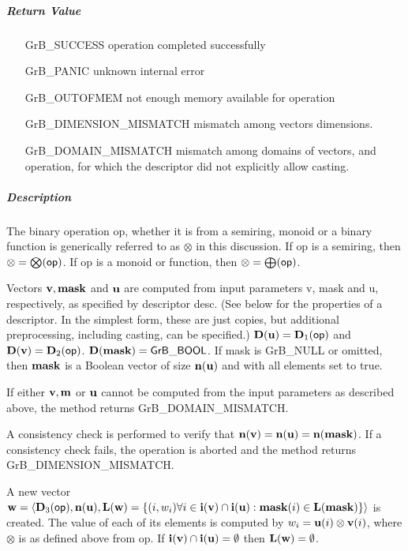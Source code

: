 \subparagraph{Return Value}

\begin{itemize}[leftmargin=2.1in]
\item[{\sf GrB\_SUCCESS}]             operation completed successfully
\item[{\sf GrB\_PANIC}]               unknown internal error
\item[{\sf GrB\_OUTOFMEM}]            not enough memory available for operation
\item[{\sf GrB\_DIMENSION\_MISMATCH}] mismatch among vectors dimensions.
\item[{\sf GrB\_DOMAIN\_MISMATCH}]    mismatch among domains of vectors, and operation, for which the descriptor did not explicitly allow casting.
\end{itemize}

\subparagraph{Description}

The binary operation {\sf op}, whether it is from a semiring, monoid or a binary function
is generically referred to as $\otimes$ in this discussion.
If {\sf op} is a semiring, then $\otimes = \bigotimes({\sf op})$. 
If {\sf op} is a monoid or function, then $\otimes = \bigoplus({\sf op})$.

Vectors ${\bf v}, {\bf mask}$ and ${\bf u}$ are computed from
input parameters {\sf v}, {\sf mask} and {\sf u}, respectively, as specified
by descriptor {\sf desc}. (See below for the properties of a descriptor. In
the simplest form, these are just copies, but additional preprocessing,
including casting, can be specified.)  $\bold{D}({\bf u}) =
\bold{D}_1({\sf op})$ and $\bold{D}({\bf v}) = \bold{D}_2({\sf op})$.
$\bold{D}({\bf mask}) = {\sf GrB\_BOOL}$.  If {\sf mask} is {\sf GrB\_NULL} or omitted,
then ${\bf mask}$ is a Boolean vector of size $\bold{n}({\bf u})$
and with all elements set to {\sf true}.

If either ${\bf v}, {\bf m}$ or ${\bf u}$ cannot be computed
from the input parameters as described above, the method returns {\sf
GrB\_DOMAIN\_MISMATCH}.

A consistency check is performed to verify that $\bold{n}({\bf v})
= \bold{n}({\bf u}) = \bold{n}({\bf mask})$. If a consistency
check fails, the operation is aborted and the method returns {\sf
GrB\_DIMENSION\_MISMATCH}.

A new vector ${\bf w} = \langle \bold{D}_3({\sf op}),
\bold{n}({\bf u}), \bold{L}({\bf w}) = \{(i,w_i)  \forall i \in
{\bf i}({\bf v}) \cap {\bf i}({\bf u}) : {\bf mask}(i)
\in \bold{L}({\bf mask}) \} \rangle$ is created.  The value of each of its
elements is computed by $w_i = {\bf u}(i) \otimes {\bf v}(i)$,
where $\otimes$ is as defined above from {\sf op}.
If ${\bf i}({\bf v}) \cap {\bf i}({\bf u}) = \emptyset$
then $\bold{L}({\bf w}) = \emptyset$.

